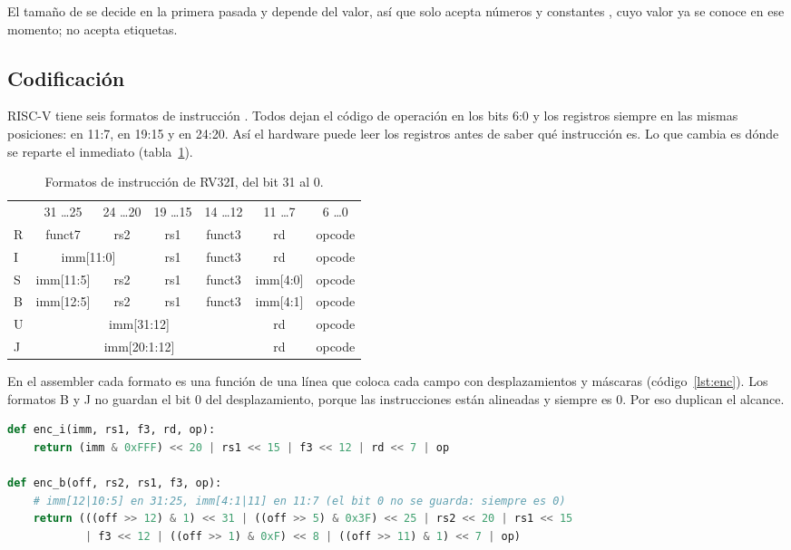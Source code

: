 El tamaño de  se decide en la primera pasada y depende del valor, así que
 solo acepta números y constantes , cuyo valor ya se conoce en ese
momento; no acepta etiquetas.

\subsection{Codificación}

RISC-V tiene seis formatos de instrucción \cite{riscv-unpriv, patterson-riscv}. Todos
dejan el código de operación en los bits 6:0 y los registros siempre en las mismas
posiciones:  en 11:7,  en 19:15 y  en 24:20. Así el
hardware puede leer los registros antes de saber qué instrucción es. Lo que cambia es
dónde se reparte el inmediato (tabla~\ref{tab:formatos}).

\begin{table}[H]
\centering
\caption{Formatos de instrucción de RV32I, del bit 31 al 0.}
\label{tab:formatos}
\small
\begin{tabular}{l|c|c|c|c|c|c|}
\cline{2-7}
 & 31 \ldots 25 & 24 \ldots 20 & 19 \ldots 15 & 14 \ldots 12 & 11 \ldots 7 & 6 \ldots 0 \\
\cline{2-7}
R & funct7 & rs2 & rs1 & funct3 & rd & opcode \\
\cline{2-7}
I & \multicolumn{2}{c|}{imm[11:0]} & rs1 & funct3 & rd & opcode \\
\cline{2-7}
S & imm[11:5] & rs2 & rs1 & funct3 & imm[4:0] & opcode \\
\cline{2-7}
B & imm[12\textbar10:5] & rs2 & rs1 & funct3 & imm[4:1\textbar11] & opcode \\
\cline{2-7}
U & \multicolumn{4}{c|}{imm[31:12]} & rd & opcode \\
\cline{2-7}
J & \multicolumn{4}{c|}{imm[20\textbar10:1\textbar11\textbar19:12]} & rd & opcode \\
\cline{2-7}
\end{tabular}
\end{table}

En el assembler cada formato es una función de una línea que coloca cada campo con
desplazamientos y máscaras (código~\ref{lst:enc}). Los formatos B y J no guardan el
bit 0 del desplazamiento, porque las instrucciones están alineadas y siempre es 0. Por
eso duplican el alcance.

\begin{lstlisting}[language=Python, caption={Codificación de los formatos I y B en \code{pochoasm.py}.}, label={lst:enc}]
def enc_i(imm, rs1, f3, rd, op):
    return (imm & 0xFFF) << 20 | rs1 << 15 | f3 << 12 | rd << 7 | op

def enc_b(off, rs2, rs1, f3, op):
    # imm[12|10:5] en 31:25, imm[4:1|11] en 11:7 (el bit 0 no se guarda: siempre es 0)
    return (((off >> 12) & 1) << 31 | ((off >> 5) & 0x3F) << 25 | rs2 << 20 | rs1 << 15
            | f3 << 12 | ((off >> 1) & 0xF) << 8 | ((off >> 11) & 1) << 7 | op)
\end{lstlisting}


